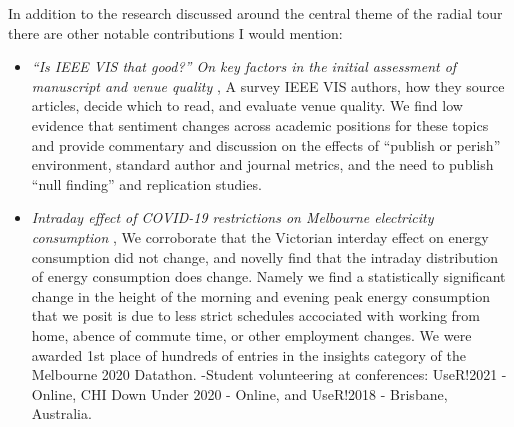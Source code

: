 \documentclass{template/monashthesis}
\begin{document}
In addition to the research discussed around the central theme of the radial tour there are other notable contributions I would mention:

\begin{itemize}
\tightlist
\item
  \emph{``Is IEEE VIS that good?'' On key factors in the initial assessment of manuscript and venue quality} \autocite{spyrison_is_2021}, A survey IEEE VIS authors, how they source articles, decide which to read, and evaluate venue quality. We find low evidence that sentiment changes across academic positions for these topics and provide commentary and discussion on the effects of ``publish or perish'' environment, standard author and journal metrics, and the need to publish ``null finding'' and replication studies.
\item
  \emph{Intraday effect of COVID-19 restrictions on Melbourne electricity consumption} \autocite{barrow_changes_2020}, We corroborate that the Victorian interday effect on energy consumption did not change, and novelly find that the intraday distribution of energy consumption does change. Namely we find a statistically significant change in the height of the morning and evening peak energy consumption that we posit is due to less strict schedules accociated with working from home, abence of commute time, or other employment changes. We were awarded 1st place of hundreds of entries in the insights category of the Melbourne 2020 Datathon.
  -Student volunteering at conferences: UseR!2021 - Online, CHI Down Under 2020 - Online, and UseR!2018 - Brisbane, Australia.
\end{itemize}

\printbibliography[heading=bibintoc]
\end{document}
